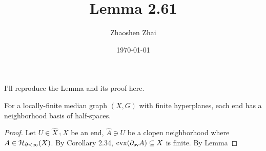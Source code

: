 \documentclass{amsart}
\begin{document}
    \title{Lemma 2.61}
    \author{Zhaoshen Zhai}
    \date{\today}
    \maketitle

    I'll reproduce the Lemma and its proof here.

    \begin{lemma*}[2.61]
        For a locally-finite median graph $(X,G)$ with finite hyperplanes, each end has a neighborhood basis of half-spaces.
    \end{lemma*}
    \begin{proof}
        Let $U\in\widehat{X}\comp X$ be an end, $\hat{A}\ni U$ be a clopen neighborhood where $A\in\mathcal{H}_{\partial<\infty}(X)$. By Corollary 2.34, $\operatorname{cvx}(\partial_{\textsf{ov}}A)\subseteq X$ is finite. By Lemma
    \end{proof}
\end{document}
